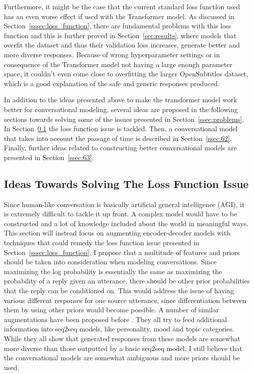 \documentclass[12pt]{article}
\begin{document}
Furthermore, it might be the case that the current standard loss function used has an even worse effect if used with the Transformer model. As discussed in Section~\ref{sssec:loss_function}, there are fundamental problems with this loss function and this is further proved in Section~\ref{sec:results}, where models that overfit the dataset and thus their validation loss increases, generate better and more diverse responses. Because of wrong hyperparameter settings or in consequence of the Transformer model not having a large enough parameter space, it couldn't even come close to overfitting the larger OpenSubtitles dataset, which is a good explanation of the safe and generic responses produced.

In addition to the ideas presented above to make the transformer model work better for conversational modeling, several ideas are proposed in the following sections towards solving some of the issues presented in Section~\ref{ssec:problems}. In Section~\ref{ssec:61} the loss function issue is tackled. Then, a conversational model that takes into account the passage of time is described in Section~\ref{ssec:62}. Finally, further ideas related to constructing better conversational models are presented in Section~\ref{ssec:63}.

\subsection{Ideas Towards Solving The Loss Function Issue} \label{ssec:61}
Since human-like conversation is basically artificial general intelligence (AGI), it is extremely difficult to tackle it up front. A complex model would have to be constructed and a lot of knowledge included about the world in meaningful ways. This section will instead focus on augmenting encoder-decoder models with techniques that could remedy the loss function issue presented in Section~\ref{sssec:loss_function}. I propose that a multitude of features and priors should be taken into consideration when modeling conversations. Since maximizing the log probability is essentially the same as maximizing the probability of a reply given an utterance, there should be other prior probabilities that the reply can be conditioned on. This would address the issue of having various different responses for one source utterance, since differentiation between them by using other priors would become possible. A number of similar augmentations have been proposed before \cite{Li:2016,Xing_topic:2017,Zhou:2017,Choudhary:2017}. They all try to feed additional information into seq2seq models, like personality, mood and topic categories. While they all show that generated responses from these models are somewhat more diverse than those outputted by a basic seq2seq model, I still believe that the conversational models are somewhat ambiguous and more priors should be used.
\end{document}
